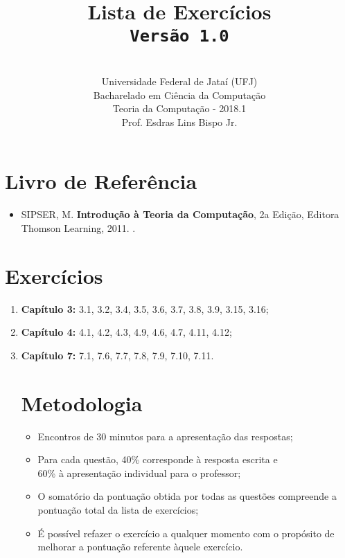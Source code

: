 \documentclass[12pt,a4paper,oneside]{article}
\author{\\Universidade Federal de Jataí (UFJ)\\Bacharelado em Ciência da Computação \\Teoria da Computação - 2018.1 \\Prof. Esdras Lins Bispo Jr.}
\date{}
\title{
	\sc \huge Lista de Exercícios
	\\{\tt Versão 1.0}
}
\begin{document}
\maketitle

\section{Livro de Referência}
	\begin{itemize}
		\item SIPSER, M. {\bf Introdução à Teoria da Computação}, 2a Edição, Editora Thomson Learning, 2011. \color{blue}{\bf Código Bib.: [004 SIP/int]}.
	\end{itemize}
	
\section{Exercícios}

\begin{enumerate}
	\item[] {\bf Capítulo 3:} 3.1, 3.2, 3.4, 3.5, 3.6, 3.7, 3.8, 3.9, 3.15, 3.16;
	\item[] {\bf Capítulo 4:} 4.1, 4.2, 4.3, 4.9, 4.6, 4.7, 4.11, 4.12;
	\item[] {\bf Capítulo 7:} 7.1, 7.6, 7.7, 7.8, 7.9, 7.10, 7.11.
	
\section{Metodologia}
	\begin{itemize}
		\item Encontros de 30 minutos para a apresentação das respostas;
		\item Para cada questão, 40\% corresponde à resposta escrita e \\60\% à apresentação individual para o professor;
		\item O somatório da pontuação obtida por todas as questões compreende a pontuação total da lista de exercícios;
		\item É possível refazer o exercício a qualquer momento com o propósito de melhorar a pontuação referente àquele exercício.
	\end{itemize}
	

	
\end{enumerate}
\end{document}
